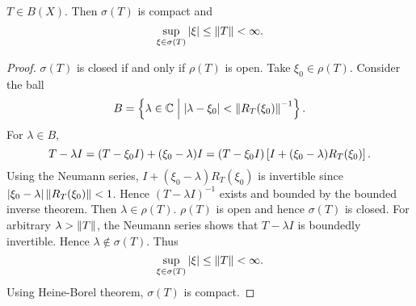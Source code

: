 \begin{theorem}\label{thm:bd_cpt_spectrum}
    $T\in B(X)$. Then $\sigma(T)$ is compact and 
    \begin{equation*}
        \sup_{\xi\in\sigma(T)}\left\lvert {\xi} \right\rvert \leq \left\lVert {T} \right\rVert < \infty. 
    \end{equation*}
\end{theorem}
\begin{proof}
    $\sigma(T)$ is closed if and only if $\rho(T)$ is open. 
    Take $\xi_0\in\rho(T)$. Consider the ball 
    \begin{equation*}
        B = \left\{ \lambda\in\mathbb{C} \;\middle\vert\; \left\lvert {\lambda - \xi_0} \right\rvert < \left\lVert {R_T(\xi_0)} \right\rVert^{-1} \right\}. 
    \end{equation*}
    For $\lambda\in B$, 
    \begin{equation*}
        T - \lambda I = (T - \xi_0 I) + (\xi_0 - \lambda)I 
        = (T - \xi_0 I)\left[ {I + (\xi_0 - \lambda)R_T(\xi_0)} \right].
    \end{equation*}
    Using the Neumann series, $I + (\xi_0 - \lambda)R_T(\xi_0)$ 
    is invertible since $\left\lvert {\xi_0 - \lambda} \right\rvert\left\lVert {R_T(\xi_0)} \right\rVert < 1$. 
    Hence $(T - \lambda I)^{-1}$ exists and bounded by the bounded inverse 
    theorem. Then $\lambda\in\rho(T)$. $\rho(T)$ is open and hence $\sigma(T)$ 
    is closed. For arbitrary $\lambda>\left\lVert {T} \right\rVert$, the Neumann series 
    shows that $T - \lambda I$ is boundedly invertible. Hence $\lambda\notin\sigma(T)$. 
    Thus 
    \begin{equation*}
        \sup_{\xi\in\sigma(T)}\left\lvert {\xi} \right\rvert \leq \left\lVert {T} \right\rVert < \infty.
    \end{equation*}
    Using Heine-Borel theorem, $\sigma(T)$ is compact.
\end{proof}

